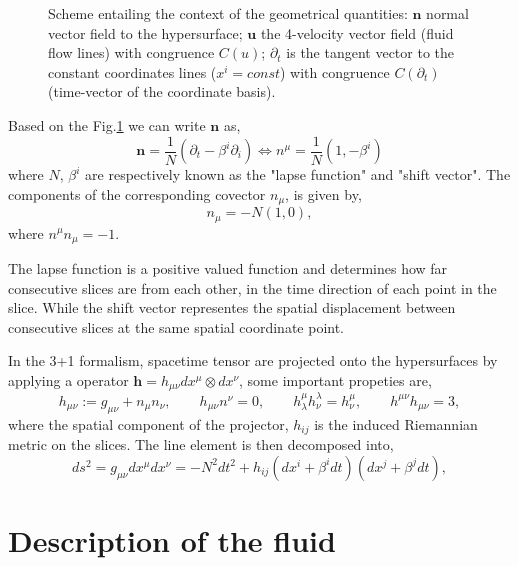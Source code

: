 \begin{figure}[ht]
\begin{tikzpicture}[x=0.75pt,y=0.75pt,yscale=-1,xscale=1]
\end{tikzpicture}
        \caption{Scheme entailing the context of the geometrical quantities: $\mathbf{n}$ normal vector field to the hypersurface; $\mathbf{u}$ the 4-velocity vector field (fluid flow lines) with congruence $C(u)$; $\partial_t$ is the tangent vector to the constant coordinates lines ($x^i=const$) with congruence $C(\partial_t)$ (time-vector of the coordinate basis).}
        \label{fig:foliation}
\end{figure}

Based on the Fig.\ref{fig:foliation} we can write $\mathbf{n}$ as,
\begin{equation}
    \mathbf{n}= \frac{1}{N}(\partial_t-\beta^i\partial_i) \Leftrightarrow n^\mu = \frac{1}{N}(1,-\beta^i)
    \label{eqn:def_normal_vector_upper}
\end{equation}
where $N$, $\beta^i$ are respectively known as the "lapse function" and "shift vector". The components of the corresponding covector $n_\mu$, is given by,
\begin{equation}
    n_\mu=-N(1,0),
    \label{eqn:def_normal_vector_lower}
\end{equation}
where $n^\mu n_\mu=-1$.

The lapse function is a positive valued function and determines how far consecutive slices are from each other, in the time direction of each point in the slice. 
While the shift vector representes the spatial displacement between consecutive slices at the same spatial coordinate point.


In the 3+1 formalism, spacetime tensor are projected onto the hypersurfaces by applying a operator $\mathbf{h}=h_{\mu\nu}dx^\mu\otimes dx^\nu$, some important propeties are,
\begin{equation}
    h_{\mu\nu}:=g_{\mu\nu}+n_\mu n_\nu, \qquad h_{\mu\nu}n^\nu=0, \qquad h^\mu_\lambda h^\lambda_\nu = h^\mu_\nu, \qquad h^{\mu\nu}h_{\mu\nu}=3,
    \label{eqn:h_properties}
\end{equation}
where the spatial component of the projector, $h_{ij}$ is the induced Riemannian metric on the slices. The line element is then decomposed into,
\begin{equation}
    ds^2=g_{\mu\nu}dx^\mu dx^\nu=-N^2dt^2+h_{ij}(dx^i+\beta^i dt)(dx^j+\beta^j dt),
    \label{eqn:general_spacetime_metric}
\end{equation}



\section{Description of the fluid}

